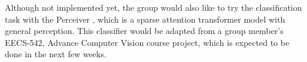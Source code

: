 \begin{par}
    \par \hspace{15pt} Although not implemented yet, the group would also like to try the classification task with the Perceiver \cite{perceiver} , which is a sparse attention transformer model with general perception. This classifier would be adapted from a group member's EECS-542, Advance Computer Vision course project, which is expected to be done in the next few weeks.  
\end{par}